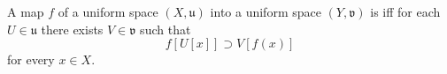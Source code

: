 \begin{definition}
A map $f$ of a uniform space $(X, \mathfrak{u})$ into a uniform space $(Y, \mathfrak{v})$ is  iff for each $U \in \mathfrak{u}$ there exists $V \in \mathfrak{v}$ such that
\[
f[U[x]] \supset V[f(x)]
\]
for every $x \in X$.
\end{definition}
